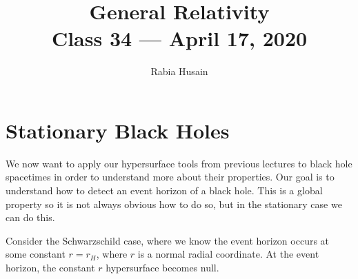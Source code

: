 \documentclass[11pt,table]{article}
\title{{\Huge General Relativity}\\{\Large{Class 34 --- April 17, 2020}}} %
\author{Rabia Husain}
\begin{document}
\maketitle
\flushbottom
\newpage
\pagestyle{fancynotes}

\part{Stationary Black Holes}

We now want to apply our hypersurface tools from previous lectures to black hole spacetimes in order to understand more about their properties. Our goal is to understand how to detect an event horizon of a black hole. This is a global property so it is not always obvious how to do so, but in the stationary case we can do this.

Consider the Schwarzschild case, where we know the event horizon occurs at some constant $r = r_{H}$, where $r$ is a normal radial coordinate. At the event horizon, the constant $r$ hypersurface becomes null.
\end{document}
